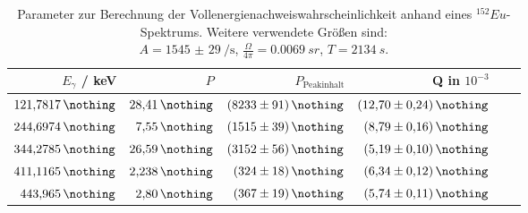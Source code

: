\begin{table}[h!]
  \centering
  \caption{Parameter zur Berechnung der Vollenergienachweiswahrscheinlichkeit anhand eines $^{152}Eu$-Spektrums. Weitere verwendete Größen sind: \\ $A=\SI{1545(29)}{\per \second}$, $\frac{\Omega}{4 \pi} = \SI{0.0069}{sr}$, $T=\SI{2134}{s}$.}
  \label{tab:}
  \begin{tabular}{ r  r  r  r  r  r  }
    \bottomrule
              $E_{\gamma}$ / keV \cite{nucleide} & $P$ \cite{nucleide}   & $P_{\text{Peakinhalt}}$    & Q in $10^{-3}$            \\ %
    \midrule
                $\SI{121.7817}{\nothing}$        & $\SI{28.41}{\nothing}$& $\SI{8233 (91)}{\nothing}$ & $\SI{12.70 (24)}{\nothing}$            \\ %
                $\SI{244.6974}{\nothing}$        & $\SI{ 7.55}{\nothing}$& $\SI{1515 (39)}{\nothing}$ & $\SI{ 8.79 (16)}{\nothing}$            \\ %
                $\SI{344.2785}{\nothing}$        & $\SI{26.59}{\nothing}$& $\SI{3152 (56)}{\nothing}$ & $\SI{ 5.19 (10)}{\nothing}$            \\ %
                $\SI{411.1165}{\nothing}$        & $\SI{2.238}{\nothing}$& $\SI{ 324 (18)}{\nothing}$ & $\SI{ 6.34 (12)}{\nothing}$            \\ %
                $\SI{ 443.965}{\nothing}$        & $\SI{ 2.80}{\nothing}$& $\SI{ 367 (19)}{\nothing}$ & $\SI{ 5.74 (11)}{\nothing}$            \\ %

\end{tabular}
\end{table}
